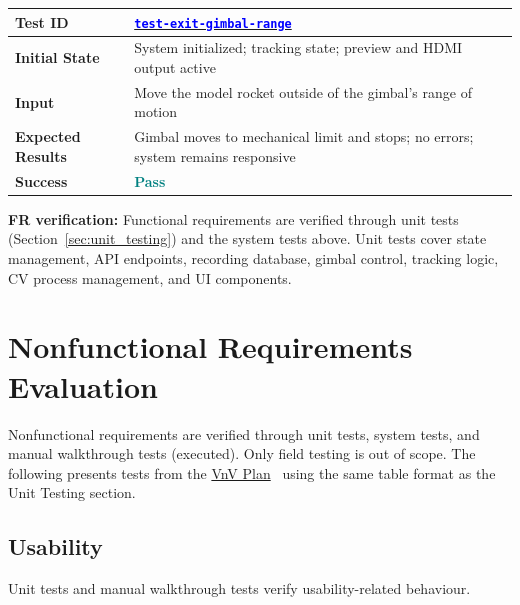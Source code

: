 \documentclass[12pt, titlepage]{article}
\newcommand{\VnVPlan}{\href{../VnVPlan/VnVPlan.pdf}{VnV Plan}}
\newcommand{\tid}[1]{\hyperlink{tid:#1}{\textcolor{blue}{\texttt{#1}}}}
\begin{document}
\begin{tabularx}{\linewidth}{|>{\raggedright\arraybackslash}p{4cm}|>{\raggedright\arraybackslash}X|}
  \hline \textbf{Test ID}          & \tid{test-exit-gimbal-range}                                                     \\
  \hline \textbf{Initial State}    & System initialized; tracking state; preview and HDMI output active               \\
  \hline \textbf{Input}            & Move the model rocket outside of the gimbal's range of motion                    \\
  \hline \textbf{Expected Results} & Gimbal moves to mechanical limit and stops; no errors; system remains responsive \\
  \hline \textbf{Success}          & \textbf{\textcolor{teal}{Pass}}                                                  \\
  \hline
\end{tabularx}
\vspace{0.75em}

\noindent\textbf{FR verification:} Functional requirements are verified through
unit tests (Section~\ref{sec:unit_testing}) and the system tests above. Unit tests
cover state management, API endpoints, recording database, gimbal control,
tracking logic, CV process management, and UI components.

\section{Nonfunctional Requirements Evaluation}
\label{sec:nfr_eval}

Nonfunctional requirements are verified through unit tests, system tests, and
manual walkthrough tests (executed). Only field testing is out of scope. The
following presents tests from the \VnVPlan~\cite{VnVPlan} using the same table
format as the Unit Testing section.

\subsection{Usability}

Unit tests and manual walkthrough tests verify usability-related behaviour.
\end{document}
